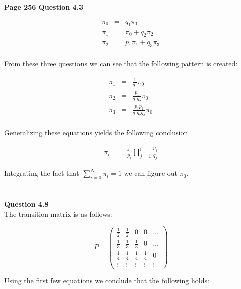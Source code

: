 \documentclass[10pt,a4paper]{article}
\begin{document}
\begin{flushleft}

\begin{eqnarray*}
\\
\end{eqnarray*}


\textbf{Page 256 Question 4.3}

\begin{eqnarray*}
\pi_0&=&q_1 \pi_1 \\
\pi_1&=&\pi_0+q_2 \pi_2\\
\pi_2&=&p_1\pi_1+q_3\pi_3\\
\end{eqnarray*}

From these three questions we can see that the following pattern
is created:

\begin{eqnarray*}
\pi_1&=&\frac{1}{q_1} \pi_0 \\
\pi_2&=&\frac{p_1}{q_1q_2} \pi_0\\
\pi_3&=&\frac{p_1p_2}{q_1q_2q_3} \pi_0\\
\end{eqnarray*}

Generalizing these equations yields the following conclusion


\begin{eqnarray*}
\pi_i&=&\frac{\pi_0}{p_i} \prod_{j=1}^{i} \frac{p_j}{q_j}
\end{eqnarray*}

Integrating the fact that $\sum_{i=0}^N \pi_i =1$ we can figure
out $\pi_0$.

\begin{eqnarray*}
\\
\end{eqnarray*}



\textbf{Question 4.8}\\
The transition matrix is as follows:

\[ P = \left ( \begin{array}{ccccc}
 \frac{1}{2} &\frac{1}{2} & 0 & 0 & \ldots  \\
 \frac{1}{3} & \frac{1}{3} & \frac{1}{3}& 0  & \ldots \\
 \frac{1}{4 }& \frac{1}{4 } & \frac{1}{4 } & \frac{1}{4 } & 0\\
 \vdots &  \vdots &  \vdots &  \vdots &  \vdots
\end{array} \right) \]

Using the first few equations we conclude that the following
holds:


\end{flushleft}
\end{document}
